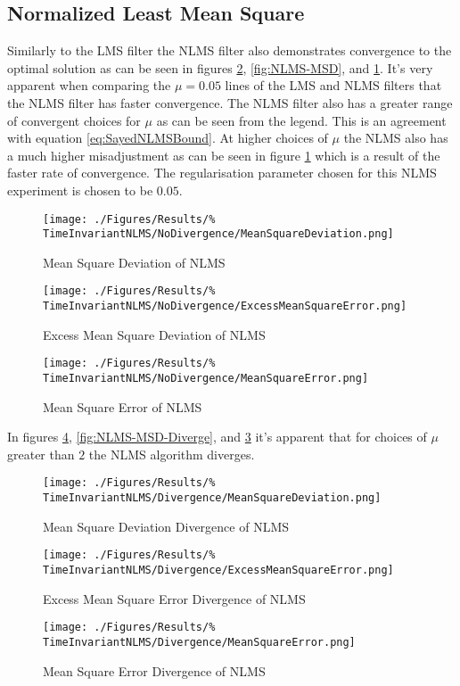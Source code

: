 \subsection{Normalized Least Mean Square}
\FloatBarrier
Similarly to the LMS filter the NLMS filter also demonstrates convergence %
to the optimal solution as can be seen in figures \ref{fig:NLMS-MSE}, %
\ref{fig:NLMS-MSD}, and \ref{fig:NLMS-EMSE}. It's very apparent when %
comparing the $\mu = 0.05$ lines of the LMS and NLMS filters that the %
NLMS filter has faster convergence. The NLMS filter also has a greater range of %
convergent choices for $\mu$ as can be seen from the legend. This is an agreement %
with equation \ref{eq:SayedNLMSBound}. At higher choices of $\mu$ the NLMS also has %
a much higher misadjustment as can be seen in figure \ref{fig:NLMS-EMSE} which is %
a result of the faster rate of convergence. The regularisation parameter chosen %
for this NLMS experiment is chosen to be $0.05$.
\begin{figure}[ht]
	\centering
	\begin{minipage}{0.49\textwidth}
		\texttt{[image: ./Figures/Results/\%
		TimeInvariantNLMS/NoDivergence/MeanSquareDeviation.png]}
		\caption{Mean Square Deviation of NLMS}
		\label{fig:NLMS-MSD}
	\end{minipage}
	\begin{minipage}{0.49\textwidth}
		\texttt{[image: ./Figures/Results/\%
		TimeInvariantNLMS/NoDivergence/ExcessMeanSquareError.png]}
		\caption{Excess Mean Square Deviation of NLMS}
		\label{fig:NLMS-EMSE}
	\end{minipage}
\end{figure}
\begin{figure}[ht]
	\centering
	\texttt{[image: ./Figures/Results/\%
	TimeInvariantNLMS/NoDivergence/MeanSquareError.png]}
	\caption{Mean Square Error of NLMS}
	\label{fig:NLMS-MSE}
\end{figure}
In figures \ref{fig:NLMS-MSE-Diverge}, \ref{fig:NLMS-MSD-Diverge}, and %
\ref{fig:NLMS-EMSE-Diverge} it's apparent that for choices of $\mu$ greater %
than $2$ the NLMS algorithm diverges.
\begin{figure}[ht]
	\centering
	\begin{minipage}{0.49\textwidth}
		\centering
		\texttt{[image: ./Figures/Results/\%
		TimeInvariantNLMS/Divergence/MeanSquareDeviation.png]}
		\caption{Mean Square Deviation Divergence of NLMS}
		\label{fig:NLMS-MSD-Diverge}
	\end{minipage}
	\begin{minipage}{0.49\textwidth}
		\centering
		\texttt{[image: ./Figures/Results/\%
		TimeInvariantNLMS/Divergence/ExcessMeanSquareError.png]}
		\caption{Excess Mean Square Error Divergence of NLMS}
		\label{fig:NLMS-EMSE-Diverge}
	\end{minipage}
\end{figure}
\begin{figure}[ht]
	\centering
	\texttt{[image: ./Figures/Results/\%
	TimeInvariantNLMS/Divergence/MeanSquareError.png]}
	\caption{Mean Square Error Divergence of NLMS}
	\label{fig:NLMS-MSE-Diverge}
\end{figure}

